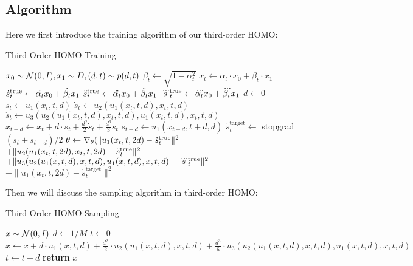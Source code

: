 \subsection{Algorithm}\label{sec:app:3rd_homo_algorithm}
Here we first introduce the training algorithm of our third-order HOMO: 
\begin{algorithm}[!ht]\caption{ Third-Order HOMO Training}
\begin{algorithmic}[1]
\State $x_0 \sim \mathcal{N} (0, I), x_1 \sim D, (d, t) \sim p(d, t)$
\State $\beta_t \gets \sqrt{1-\alpha_t^2}$
\State $x_t \gets \alpha_t \cdot x_0 + \beta_t \cdot x_1$ 
\State $\dot s_t^{\mathrm{true}} \gets \dot{\alpha_t} x_0 + \dot{\beta_t} x_1$ 
\State $\ddot s_t^{\mathrm{true}} \gets \ddot{\alpha_t} x_0 + \ddot{\beta_t} x_1$ 
\State $\dddot s_t^{\mathrm{true}} \gets \dddot{\alpha_t} x_0 + \dddot{\beta_t} x_1$ 
\State $d \gets 0$
\EndFor
{}
\State $s_t \gets u_1 ( x_t, t, d)$ 
\State $\dot s_t \gets u_2 (u_1 ( x_t, t, d), x_t, t, d)$ 
\State $\ddot s_t \gets u_3 (u_2(u_1(x_t, t, d), x_t, t, d), u_1(x_t, t, d), x_t, t, d)$ 
\State $x_{t + d} \gets x_t + d \cdot s_t + \frac{d^2}{2} \dot s_t + \frac{d^6}{3} \ddot s_t $ 
\State $s_{t + d} \gets u_1 ( x_{t + d}, t + d, d )$ 
\State $\dot s_t^{\mathrm{target}} \gets$ stopgrad $(s_t + s_{t+d}) / 2$ 
\EndFor
\State $\theta \gets \nabla_\theta ( \| u_1 ( x_t, t, 2d ) - \dot s_t^{\mathrm{true}} \|^2$
\Statex \hspace{4.2em} $ + \| u_2 (u_1 (x_t, t, 2d), x_t, t, 2d) - \ddot s_t^{\mathrm{true}} \|^2$
\Statex \hspace{4.2em} $ + \| u_3 (u_2(u_1(x, t, d), x, t, d), u_1(x, t, d), x, t, d) - \dddot{s}_t^{\mathrm{true}} \|^2 $
\Statex \hspace{4.2em} $ + \| u_{1}(x_t, t, 2 d) - \dot{s}_t^{\mathrm{target}}\|^2$
\EndWhile
\end{algorithmic}
\end{algorithm}

Then we will discuss the sampling algorithm in third-order HOMO: 
\begin{algorithm}[!ht]\caption{Third-Order HOMO Sampling}
\begin{algorithmic}[1]
\State $x \sim \mathcal{N} (0, I)$
\State $d \gets 1 / M$
\State $t \gets 0$
\State $x \gets x + d \cdot u_1(x, t, d) + \frac{d^2}{2} \cdot u_2(u_1(x, t, d), x, t, d) + \frac{d^3}{6}\cdot u_3 (u_2(u_1(x, t, d), x, t, d), u_1(x, t, d), x, t, d)$
\State $t \gets t + d$
\EndFor
\State \textbf{return} $x$
\end{algorithmic}
\end{algorithm}


